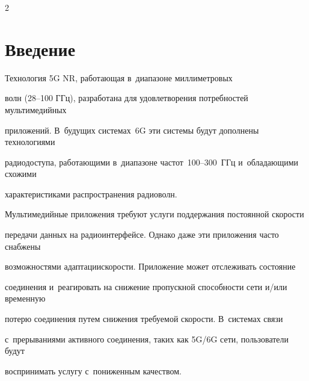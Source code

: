 \vspace*{-2pt}








\thispagestyle{headings}



\begin{multicols}{2}



\label{st\stat}

    

\section{Введение}









Технология 5G NR, ра\-бо\-та\-ющая в~диапазоне мил\-ли\-мет\-ро\-вых 

волн (28--100 ГГц), разработана для удовле\-тво\-ре\-ния потребностей мультимедийных 

приложений. В~будущих сис\-те\-мах~6G эти сис\-те\-мы будут дополнены технологиями 

радиодоступа, ра\-бо\-та\-ющи\-ми в~диапазоне час\-тот~100--300~ГГц и~об\-ла\-да\-ющи\-ми схожими 

характеристиками распространения ра\-дио\-волн.



Мультимедийные приложения требуют услуги поддержания по\-сто\-ян\-ной ско\-рости 

передачи данных на радиоинтерфейсе. Однако даже эти приложения час\-то снабжены 

возможностями адап\-та\-ции\linebreak ско\-рости. Приложение может отслеживать со\-сто\-яние 

со\-еди\-не\-ния и~реагировать на снижение пропускной спо\-соб\-ности сети и/или временную 

потерю соединения путем снижения тре\-бу\-емой \mbox{ско\-рости}. В~сис\-те\-мах связи 

с~прерываниями активного со\-еди\-не\-ния, таких как 5G/6G сети, пользователи будут 

воспринимать услугу с~пониженным качеством.




\end{multicols}
